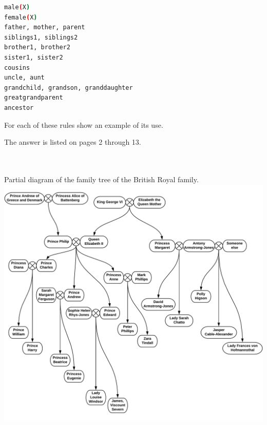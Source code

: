 \documentclass{article}
\begin{document}
	\begin{lstlisting}[language=bash]
male(X)
female(X)
father, mother, parent
siblings1, siblings2
brother1, brother2
sister1, sister2
cousins
uncle, aunt
grandchild, grandson, granddaughter
greatgrandparent
ancestor
	\end{lstlisting}
	
	For each of these rules show an example of its use.
	\newline
	
	The answer is listed on pages 2 through 13.
	
	
\paragraph{}\	
	
	
	\rmfamily
		Partial diagram of the family tree of the British Royal family.
		\newline
		\includegraphics[width=\textwidth+120pt]{royalfamily2}
	


\paragraph{}\
\paragraph{}\
\paragraph{}\
\end{document}
